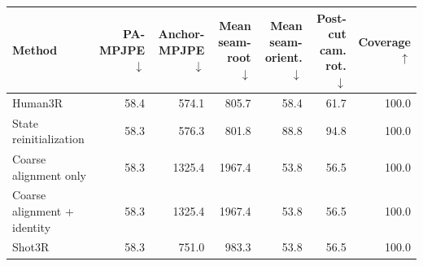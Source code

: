 \begin{tabular}{lrrrrrr}
\toprule
Method & PA-MPJPE $\downarrow$ & Anchor-MPJPE $\downarrow$ & Mean seam-root $\downarrow$ & Mean seam-orient. $\downarrow$ & Post-cut cam. rot. $\downarrow$ & Coverage $\uparrow$ \\
\midrule
Human3R & 58.4 & 574.1 & 805.7 & 58.4 & 61.7 & 100.0 \\
State reinitialization & 58.3 & 576.3 & 801.8 & 88.8 & 94.8 & 100.0 \\
Coarse alignment only & 58.3 & 1325.4 & 1967.4 & 53.8 & 56.5 & 100.0 \\
Coarse alignment + identity & 58.3 & 1325.4 & 1967.4 & 53.8 & 56.5 & 100.0 \\
Shot3R & 58.3 & 751.0 & 983.3 & 53.8 & 56.5 & 100.0 \\
\bottomrule
\end{tabular}
